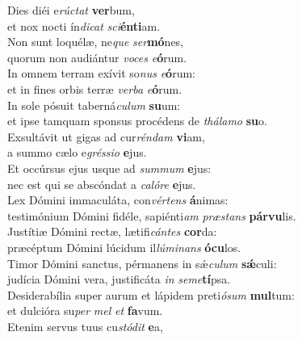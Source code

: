 \evenverse Dies diéi e\textit{rú}\textit{ctat} \textbf{ver}bum,~\*\\
\evenverse et nox nocti ín\textit{di}\textit{cat} \textit{sci}\textbf{én}\textbf{ti}am.\\
\oddverse Non sunt loquélæ, ne\textit{que} \textit{ser}\textbf{mó}nes,~\*\\
\oddverse quorum non audiántur \textit{vo}\textit{ces} \textit{e}\textbf{ó}rum.\\
\evenverse In omnem terram exívit so\textit{nus} \textit{e}\textbf{ó}rum:~\*\\
\evenverse et in fines orbis terræ \textit{ver}\textit{ba} \textit{e}\textbf{ó}rum.\\
\oddverse In sole pósuit taberná\textit{cu}\textit{lum} \textbf{su}um:~\*\\
\oddverse et ipse tamquam sponsus procédens de \textit{thá}\textit{la}\textit{mo} \textbf{su}o.\\
\evenverse Exsultávit ut gigas ad cur\textit{rén}\textit{dam} \textbf{vi}am,~\*\\
\evenverse a summo cælo e\textit{grés}\textit{si}\textit{o} \textbf{e}jus.\\
\oddverse Et occúrsus ejus usque ad \textit{sum}\textit{mum} \textbf{e}jus:~\*\\
\oddverse nec est qui se abscóndat a \textit{ca}\textit{ló}\textit{re} \textbf{e}jus.\\
\evenverse Lex Dómini immaculáta, con\textit{vér}\textit{tens} \textbf{á}nimas:~\*\\
\evenverse testimónium Dómini fidéle, sapiénti\textit{am} \textit{præ}\textit{stans} \textbf{pár}\textbf{vu}lis.\\
\oddverse Justítiæ Dómini rectæ, lætifi\textit{cán}\textit{tes} \textbf{cor}da:~\*\\
\oddverse præcéptum Dómini lúcidum il\textit{lú}\textit{mi}\textit{nans} \textbf{ó}\textbf{cu}los.\\
\evenverse Timor Dómini sanctus, pérmanens in sǽ\textit{cu}\textit{lum} \textbf{sǽ}culi:~\*\\
\evenverse judícia Dómini vera, justificáta \textit{in} \textit{se}\textit{me}\textbf{tí}psa.\\
\oddverse Desiderabília super aurum et lápidem preti\textit{ó}\textit{sum} \textbf{mul}tum:~\*\\
\oddverse et dulcióra su\textit{per} \textit{mel} \textit{et} \textbf{fa}vum.\\
\evenverse Etenim servus tuus cu\textit{stó}\textit{dit} \textbf{e}a,~\*\\
